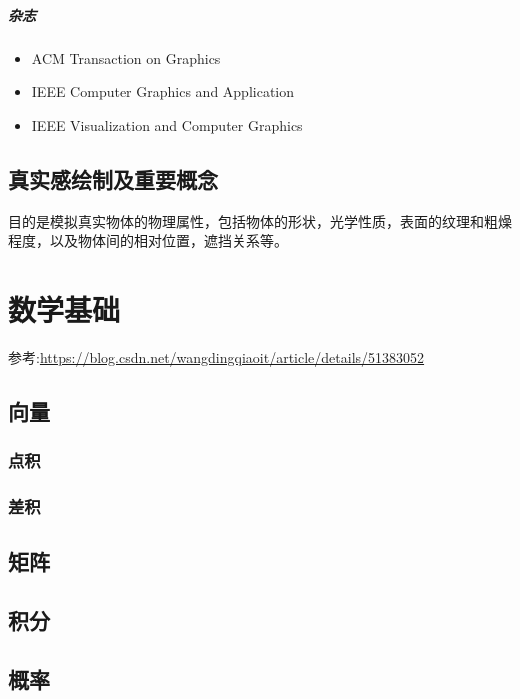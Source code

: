 \documentclass[UTF8,a4paper,12pt]{ctexbook}
\begin{document}
		\paragraph{杂志}
			\begin{itemize}
				\item ACM Transaction on Graphics
				\item IEEE Computer Graphics and Application
				\item IEEE Visualization and Computer Graphics
			\end{itemize}


	\section{真实感绘制及重要概念}
		目的是模拟真实物体的物理属性，包括物体的形状，光学性质，表面的纹理和粗燥程度，以及物体间的相对位置，遮挡关系等。
		


\chapter{数学基础}
	参考:\url{https://blog.csdn.net/wangdingqiaoit/article/details/51383052}
	\section{向量}
		\subsection{点积}
	
		\subsection{差积}
		
	
	\section{矩阵}
		
	\section{积分}
	
	\section{概率}
\end{document}
